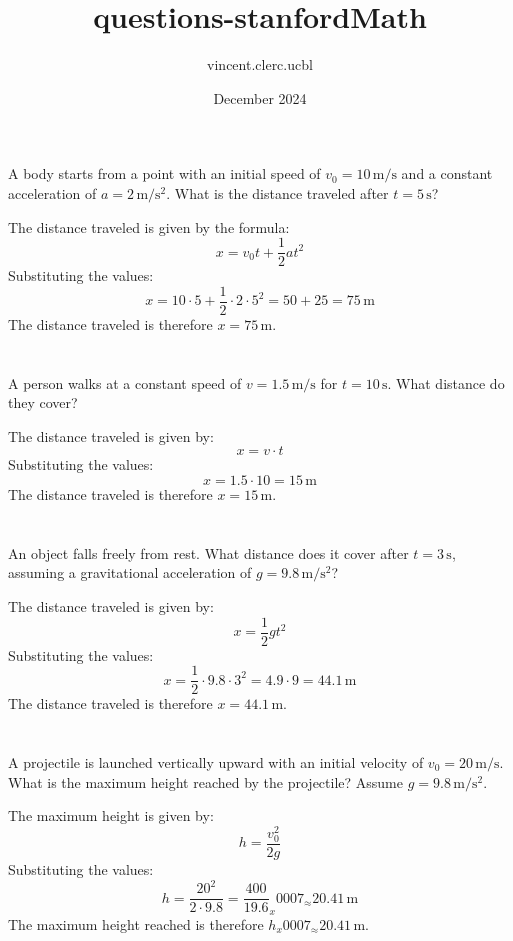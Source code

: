 \documentclass{article}
\title{questions-stanfordMath}
\author{vincent.clerc.ucbl }
\date{December 2024}
\begin{document}
\section{}
A body starts from a point with an initial speed of \( v_0 = 10 \, \mathrm{m/s} \) and a constant acceleration of \( a = 2 \, \mathrm{m/s^2} \). What is the distance traveled after \( t = 5 \, \mathrm{s} \)?

The distance traveled is given by the formula: \[ x = v_0 t + \frac{1}{2} a t^2 \] Substituting the values: \[ x = 10 \cdot 5 + \frac{1}{2} \cdot 2 \cdot 5^2 = 50 + 25 = 75 \, \mathrm{m} \] The distance traveled is therefore \( x = 75 \, \mathrm{m} \).

\section{}
A person walks at a constant speed of \( v = 1.5 \, \mathrm{m/s} \) for \( t = 10 \, \mathrm{s} \). What distance do they cover?

The distance traveled is given by: \[ x = v \cdot t \] Substituting the values: \[ x = 1.5 \cdot 10 = 15 \, \mathrm{m} \] The distance traveled is therefore \( x = 15 \, \mathrm{m} \).

\section{}
An object falls freely from rest. What distance does it cover after \( t = 3 \, \mathrm{s} \), assuming a gravitational acceleration of \( g = 9.8 \, \mathrm{m/s^2} \)?

The distance traveled is given by: \[ x = \frac{1}{2} g t^2 \] Substituting the values: \[ x = \frac{1}{2} \cdot 9.8 \cdot 3^2 = 4.9 \cdot 9 = 44.1 \, \mathrm{m} \] The distance traveled is therefore \( x = 44.1 \, \mathrm{m} \).

\section{}
A projectile is launched vertically upward with an initial velocity of \( v_0 = 20 \, \mathrm{m/s} \). What is the maximum height reached by the projectile? Assume \( g = 9.8 \, \mathrm{m/s^2} \).

The maximum height is given by: \[ h = \frac{v_0^2}{2 g} \] Substituting the values: \[ h = \frac{20^2}{2 \cdot 9.8} = \frac{400}{19.6} _x0007_\approx 20.41 \, \mathrm{m} \] The maximum height reached is therefore \( h _x0007_\approx 20.41 \, \mathrm{m} \).
\end{document}
